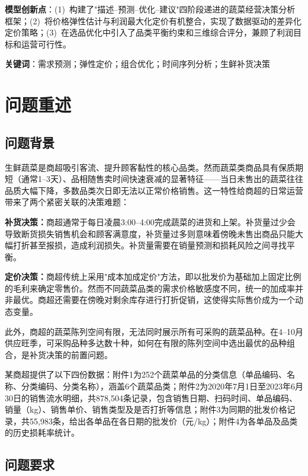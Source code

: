 \documentclass[12pt,a4paper]{ctexart}
\begin{document}
\textbf{模型创新点}：(1)~构建了"描述--预测--优化--建议"四阶段递进的蔬菜经营决策分析框架；(2)~将价格弹性估计与利润最大化定价有机整合，实现了数据驱动的差异化定价策略；(3)~在选品优化中引入了品类平衡约束和三维综合评分，兼顾了利润目标和运营可行性。

\textbf{关键词}：需求预测；弹性定价；组合优化；时间序列分析；生鲜补货决策

\newpage

\section{问题重述}

\subsection{问题背景}

生鲜蔬菜是商超吸引客流、提升顾客黏性的核心品类。然而蔬菜类商品具有保质期短（通常1--3天）、品相随售卖时间快速衰减的显著特征——当日未售出的蔬菜往往品质大幅下降，多数品类次日即无法以正常价格销售。这一特性给商超的日常运营带来了两个紧密关联的决策难题：

\textbf{补货决策：}商超通常于每日凌晨3:00--4:00完成蔬菜的进货和上架。补货量过少会导致断货损失销售机会和顾客满意度，补货量过多则意味着傍晚未售出商品只能大幅打折甚至报损，造成利润损失。补货量需要在销量预测和损耗风险之间寻找平衡。

\textbf{定价决策：}商超传统上采用"成本加成定价"方法，即以批发价为基础加上固定比例的毛利来确定零售价。然而不同蔬菜品类的需求价格敏感度不同，统一的加成率并非最优。商超还需要在傍晚对剩余库存进行打折促销，这使得实际售价成为一个动态变量。

此外，商超的蔬菜陈列空间有限，无法同时展示所有可采购的蔬菜品种。在4--10月供应旺季，可采购品种多达数十种，如何在有限的陈列空间中选出最优的品种组合，是补货决策的前置问题。

某商超提供了以下四份数据：附件1为252个蔬菜单品的分类信息（单品编码、名称、分类编码、分类名称），涵盖6个蔬菜品类；附件2为2020年7月1日至2023年6月30日的销售流水明细，共878,504条记录，包含销售日期、扫码时间、单品编码、销量（kg）、销售单价、销售类型及是否打折等信息；附件3为同期的批发价格记录，共55,983条，给出各单品在各日期的批发价（元/kg）；附件4为各单品及品类的历史损耗率统计。

\subsection{问题要求}
\end{document}
